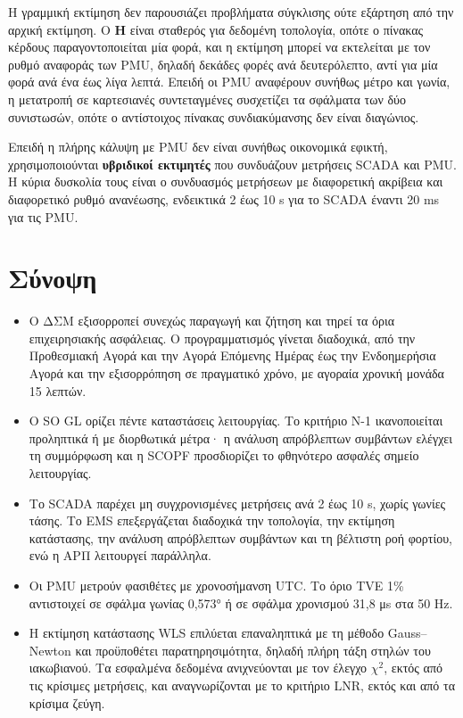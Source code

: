 Η γραμμική εκτίμηση δεν παρουσιάζει προβλήματα σύγκλισης ούτε εξάρτηση από την αρχική
εκτίμηση. Ο $\mathbf{H}$ είναι σταθερός για δεδομένη τοπολογία, οπότε ο πίνακας κέρδους
παραγοντοποιείται μία φορά, και η εκτίμηση μπορεί να εκτελείται με τον ρυθμό αναφοράς των
PMU, δηλαδή δεκάδες φορές ανά δευτερόλεπτο, αντί για μία φορά ανά ένα έως λίγα λεπτά. Επειδή
οι PMU αναφέρουν συνήθως μέτρο και γωνία, η μετατροπή σε καρτεσιανές συντεταγμένες συσχετίζει
τα σφάλματα των δύο συνιστωσών, οπότε ο αντίστοιχος πίνακας συνδιακύμανσης δεν είναι
διαγώνιος.

Επειδή η πλήρης κάλυψη με PMU δεν είναι συνήθως οικονομικά εφικτή, χρησιμοποιούνται
\textbf{υβριδικοί εκτιμητές} που συνδυάζουν μετρήσεις SCADA και PMU. Η κύρια δυσκολία τους
είναι ο συνδυασμός μετρήσεων με διαφορετική ακρίβεια και διαφορετικό ρυθμό ανανέωσης,
ενδεικτικά 2 έως 10 s για το SCADA έναντι 20 ms για τις PMU.

\section{Σύνοψη}

\begin{itemize}
\item Ο ΔΣΜ εξισορροπεί συνεχώς παραγωγή και ζήτηση και τηρεί τα όρια επιχειρησιακής ασφάλειας.
      Ο προγραμματισμός γίνεται διαδοχικά, από την Προθεσμιακή Αγορά και την Αγορά Επόμενης
      Ημέρας έως την Ενδοημερήσια Αγορά και την εξισορρόπηση σε πραγματικό χρόνο, με αγοραία
      χρονική μονάδα 15 λεπτών.
\item Ο SO GL ορίζει πέντε καταστάσεις λειτουργίας. Το κριτήριο N-1 ικανοποιείται προληπτικά ή
      με διορθωτικά μέτρα· η ανάλυση απρόβλεπτων συμβάντων ελέγχει τη συμμόρφωση και η SCOPF
      προσδιορίζει το φθηνότερο ασφαλές σημείο λειτουργίας.
\item Το SCADA παρέχει μη συγχρονισμένες μετρήσεις ανά 2 έως 10 s, χωρίς γωνίες τάσης. Το EMS
      επεξεργάζεται διαδοχικά την τοπολογία, την εκτίμηση κατάστασης, την ανάλυση απρόβλεπτων
      συμβάντων και τη βέλτιστη ροή φορτίου, ενώ η ΑΡΠ λειτουργεί παράλληλα.
\item Οι PMU μετρούν φασιθέτες με χρονοσήμανση UTC. Το όριο TVE 1\% αντιστοιχεί σε σφάλμα
      γωνίας 0,573° ή σε σφάλμα χρονισμού 31,8 μs στα 50 Hz.
\item Η εκτίμηση κατάστασης WLS επιλύεται επαναληπτικά με τη μέθοδο Gauss--Newton και
      προϋποθέτει παρατηρησιμότητα, δηλαδή πλήρη τάξη στηλών του ιακωβιανού. Τα εσφαλμένα
      δεδομένα ανιχνεύονται με τον έλεγχο $\chi^2$, εκτός από τις κρίσιμες μετρήσεις, και
      αναγνωρίζονται με το κριτήριο LNR, εκτός και από τα κρίσιμα ζεύγη.
\end{itemize}

